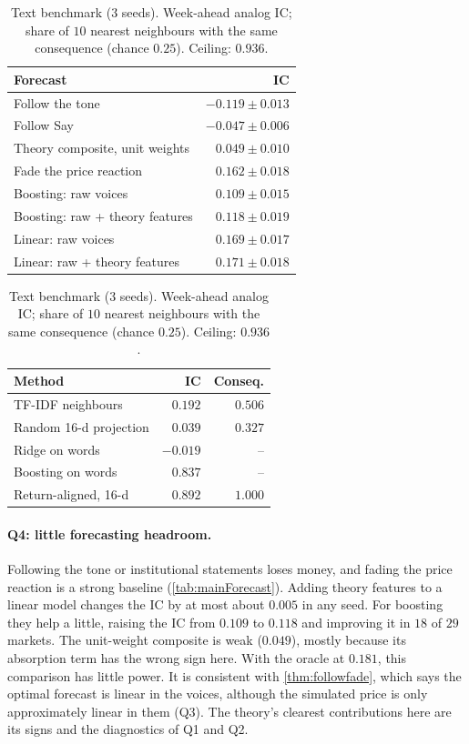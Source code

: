 \documentclass{article}
\theoremstyle{plain}
\theoremstyle{definition}
\theoremstyle{remark}
\begin{document}
\begin{table}[t]
\centering
\begin{minipage}[t]{0.5\textwidth}
\centering
\caption{Out-of-sample IC, main market ($5$ seeds; oracle $v-p$: $0.181$).}
\label{tab:mainForecast}
\small
\begin{tabular}{@{}lr@{}}
\toprule
Forecast & IC \\
\midrule
Follow the tone & $-0.119\pm0.013$ \\
Follow Say & $-0.047\pm0.006$ \\
Theory composite, unit weights & $0.049\pm0.010$ \\
Fade the price reaction & $0.162\pm0.018$ \\
Boosting: raw voices & $0.109\pm0.015$ \\
Boosting: raw + theory features & $0.118\pm0.019$ \\
Linear: raw voices & $0.169\pm0.017$ \\
Linear: raw + theory features & $\mathbf{0.171\pm0.018}$ \\
\bottomrule
\end{tabular}
\end{minipage}\hfill
\begin{minipage}[t]{0.47\textwidth}
\centering
\caption{Text benchmark ($3$ seeds). Week-ahead analog IC; share of $10$ nearest neighbours with the same consequence (chance $0.25$). Ceiling: $0.936$.}
\label{tab:mainText}
\small
\setlength{\tabcolsep}{4pt}
\begin{tabular}{@{}lrr@{}}
\toprule
Method & IC & Conseq. \\
\midrule
TF-IDF neighbours & $0.192$ & $0.506$ \\
Random 16-d projection & $0.039$ & $0.327$ \\
Ridge on words & $-0.019$ & -- \\
Boosting on words & $0.837$ & -- \\
Return-aligned, 16-d & $\mathbf{0.892}$ & $\mathbf{1.000}$ \\
\bottomrule
\end{tabular}
\end{minipage}
\end{table}

\paragraph{Q4: little forecasting headroom.} Following the tone or institutional statements loses money, and fading the price reaction is a strong baseline (\cref{tab:mainForecast}). Adding theory features to a linear model changes the IC by at most about $0.005$ in any seed. For boosting they help a little, raising the IC from $0.109$ to $0.118$ and improving it in $18$ of $29$ markets. The unit-weight composite is weak ($0.049$), mostly because its absorption term has the wrong sign here. With the oracle at $0.181$, this comparison has little power. It is consistent with \cref{thm:followfade}, which says the optimal forecast is linear in the voices, although the simulated price is only approximately linear in them (Q3). The theory's clearest contributions here are its signs and the diagnostics of Q1 and Q2.
\end{document}
